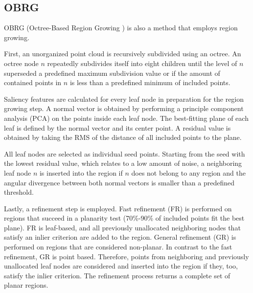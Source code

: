 \documentclass[main.tex]{subfiles}
\begin{document}
\subsection{OBRG} \label{sec:bg-obrg}
OBRG (Octree-Based Region Growing \cite{Vo_Truong-Hong_Laefer_Bertolotto_2015}) is also a method that employs region growing.

First, an unorganized point cloud is recursively subdivided using an octree. 
An octree node $n$ repeatedly subdivides itself into eight children until the level of $n$ superseded a predefined maximum subdivision value or if the
amount of contained points in $n$ is less than a predefined minimum of included points.  

Saliency features are calculated for every leaf node in preparation for the region growing step. A normal vector is obtained by performing a principle 
component analysis (PCA) on the points inside each leaf node. The best-fitting plane of each leaf is defined by the normal vector and its center point.
A residual value is obtained by taking the RMS of the distance of all included points to the plane.

All leaf nodes are selected as individual seed points. Starting from the seed with the lowest residual value, which relates to a low amount of noise, 
a neighboring leaf node $n$ is inserted into the region if $n$ does not belong to any region and the angular divergence between both normal vectors is smaller than 
a predefined threshold. 

Lastly, a refinement step is employed. 
Fast refinement (FR) is performed on regions that succeed in a planarity test (70\%-90\% of included points fit the best plane). FR is leaf-based, and all previously unallocated neighboring nodes that satisfy an inlier criterion are added to the region.
General refinement (GR) is performed on regions that are considered non-planar. In contrast to the fast refinement, GR is point based. Therefore, 
points from neighboring and previously unallocated leaf nodes are considered and inserted into the region if they, too, satisfy the inlier criterion.
The refinement process returns a complete set of planar regions. 
\end{document}
